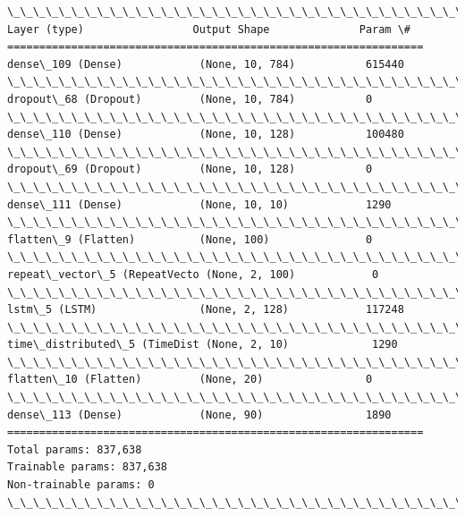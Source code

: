 \documentclass[11pt]{article}
\begin{document}
    \begin{Verbatim}[commandchars=\\\{\}]
\_\_\_\_\_\_\_\_\_\_\_\_\_\_\_\_\_\_\_\_\_\_\_\_\_\_\_\_\_\_\_\_\_\_\_\_\_\_\_\_\_\_\_\_\_\_\_\_\_\_\_\_\_\_\_\_\_\_\_\_\_\_\_\_\_
Layer (type)                 Output Shape              Param \#   
=================================================================
dense\_109 (Dense)            (None, 10, 784)           615440    
\_\_\_\_\_\_\_\_\_\_\_\_\_\_\_\_\_\_\_\_\_\_\_\_\_\_\_\_\_\_\_\_\_\_\_\_\_\_\_\_\_\_\_\_\_\_\_\_\_\_\_\_\_\_\_\_\_\_\_\_\_\_\_\_\_
dropout\_68 (Dropout)         (None, 10, 784)           0         
\_\_\_\_\_\_\_\_\_\_\_\_\_\_\_\_\_\_\_\_\_\_\_\_\_\_\_\_\_\_\_\_\_\_\_\_\_\_\_\_\_\_\_\_\_\_\_\_\_\_\_\_\_\_\_\_\_\_\_\_\_\_\_\_\_
dense\_110 (Dense)            (None, 10, 128)           100480    
\_\_\_\_\_\_\_\_\_\_\_\_\_\_\_\_\_\_\_\_\_\_\_\_\_\_\_\_\_\_\_\_\_\_\_\_\_\_\_\_\_\_\_\_\_\_\_\_\_\_\_\_\_\_\_\_\_\_\_\_\_\_\_\_\_
dropout\_69 (Dropout)         (None, 10, 128)           0         
\_\_\_\_\_\_\_\_\_\_\_\_\_\_\_\_\_\_\_\_\_\_\_\_\_\_\_\_\_\_\_\_\_\_\_\_\_\_\_\_\_\_\_\_\_\_\_\_\_\_\_\_\_\_\_\_\_\_\_\_\_\_\_\_\_
dense\_111 (Dense)            (None, 10, 10)            1290      
\_\_\_\_\_\_\_\_\_\_\_\_\_\_\_\_\_\_\_\_\_\_\_\_\_\_\_\_\_\_\_\_\_\_\_\_\_\_\_\_\_\_\_\_\_\_\_\_\_\_\_\_\_\_\_\_\_\_\_\_\_\_\_\_\_
flatten\_9 (Flatten)          (None, 100)               0         
\_\_\_\_\_\_\_\_\_\_\_\_\_\_\_\_\_\_\_\_\_\_\_\_\_\_\_\_\_\_\_\_\_\_\_\_\_\_\_\_\_\_\_\_\_\_\_\_\_\_\_\_\_\_\_\_\_\_\_\_\_\_\_\_\_
repeat\_vector\_5 (RepeatVecto (None, 2, 100)            0         
\_\_\_\_\_\_\_\_\_\_\_\_\_\_\_\_\_\_\_\_\_\_\_\_\_\_\_\_\_\_\_\_\_\_\_\_\_\_\_\_\_\_\_\_\_\_\_\_\_\_\_\_\_\_\_\_\_\_\_\_\_\_\_\_\_
lstm\_5 (LSTM)                (None, 2, 128)            117248    
\_\_\_\_\_\_\_\_\_\_\_\_\_\_\_\_\_\_\_\_\_\_\_\_\_\_\_\_\_\_\_\_\_\_\_\_\_\_\_\_\_\_\_\_\_\_\_\_\_\_\_\_\_\_\_\_\_\_\_\_\_\_\_\_\_
time\_distributed\_5 (TimeDist (None, 2, 10)             1290      
\_\_\_\_\_\_\_\_\_\_\_\_\_\_\_\_\_\_\_\_\_\_\_\_\_\_\_\_\_\_\_\_\_\_\_\_\_\_\_\_\_\_\_\_\_\_\_\_\_\_\_\_\_\_\_\_\_\_\_\_\_\_\_\_\_
flatten\_10 (Flatten)         (None, 20)                0         
\_\_\_\_\_\_\_\_\_\_\_\_\_\_\_\_\_\_\_\_\_\_\_\_\_\_\_\_\_\_\_\_\_\_\_\_\_\_\_\_\_\_\_\_\_\_\_\_\_\_\_\_\_\_\_\_\_\_\_\_\_\_\_\_\_
dense\_113 (Dense)            (None, 90)                1890      
=================================================================
Total params: 837,638
Trainable params: 837,638
Non-trainable params: 0
\_\_\_\_\_\_\_\_\_\_\_\_\_\_\_\_\_\_\_\_\_\_\_\_\_\_\_\_\_\_\_\_\_\_\_\_\_\_\_\_\_\_\_\_\_\_\_\_\_\_\_\_\_\_\_\_\_\_\_\_\_\_\_\_\_

    \end{Verbatim}
\end{document}
